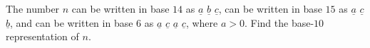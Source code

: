 The number \(n\) can be written in base \(14\) as \(\underline{a}\) \(\underline{b}\) \(\underline{c}\), can be written in base \(15\) as \(\underline{a}\) \(\underline{c}\) \(\underline{b}\), and can be written in base \(6\) as \(\underline{a}\) \(\underline{c}\) \(\underline{a}\) \(\underline{c}\), where \(a > 0\). Find the base-\(10\) representation of \(n\).